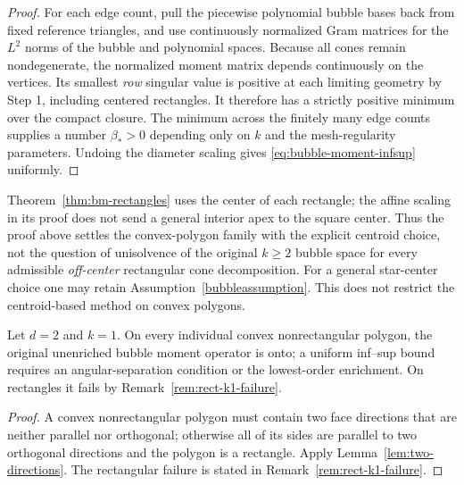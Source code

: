 \documentclass[review,hidelinks,onefignum,onetabnum]{siamart251216}
\begin{document}
\begin{proof}
For each edge count, pull the piecewise polynomial bubble bases back
from fixed reference triangles, and use continuously normalized
Gram matrices for the $L^2$ norms of the bubble and polynomial
spaces. Because all cones remain nondegenerate, the normalized moment
matrix depends continuously on the vertices. Its smallest
\emph{row} singular value is positive at each limiting geometry by
Step 1, including centered rectangles. It therefore has a strictly
positive minimum over the compact closure. The minimum across the
finitely many edge counts supplies a number $\beta_*>0$ depending
only on $k$ and the mesh-regularity parameters. Undoing the diameter
scaling gives \eqref{eq:bubble-moment-infsup} uniformly.
\end{proof}

\begin{remark}
\label{rem:rectangle-offcenter}
Theorem~\ref{thm:bm-rectangles} uses the center of each rectangle;
the affine scaling in its proof does not send a general interior apex
to the square center. Thus the proof above settles the convex-polygon
family with the explicit centroid choice, not the question of
unisolvence of the original $k\ge2$ bubble space for every admissible
\emph{off-center} rectangular cone decomposition. For a general
star-center choice one may retain Assumption~\ref{bubbleassumption}.
This does not restrict the centroid-based method on convex polygons.
\end{remark}

\begin{corollary}\label{cor:k1-convex}
Let $d=2$ and $k=1$.  On every individual convex nonrectangular polygon, the original
unenriched bubble moment operator is onto; a uniform inf--sup bound
requires an angular-separation condition or the lowest-order enrichment.  On rectangles it fails by
Remark~\ref{rem:rect-k1-failure}.
\end{corollary}
\begin{proof}
A convex nonrectangular polygon must contain two face directions that are
neither parallel nor orthogonal; otherwise all of its sides are parallel to
two orthogonal directions and the polygon is a rectangle.  Apply
Lemma~\ref{lem:two-directions}.  The rectangular failure is stated in
Remark~\ref{rem:rect-k1-failure}.
\end{proof}
\end{document}
